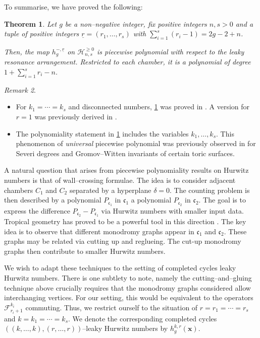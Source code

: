 \documentclass[10pt,a4paper,oneside,no-math,reqno]{amsart}%
\theoremstyle{plain}
\newtheorem{theorem}{Theorem}[section]
\theoremstyle{definition}
\theoremstyle{remark}
\newtheorem{remark}[theorem]{Remark}
\numberwithin{equation}{section}
\newcommand{\1}{\mathds{1}}
\newcommand{\<}{\langle}
\renewcommand{\>}{\rangle}
\begin{document}
To summarise, we have proved the following:

\begin{theorem}
\label{thm-piecepoly}
    Let $g$ be a non--negative integer, fix positive integers $n,s>0$ and a tuple of positive integers $\underline{r}=(r_1,\dots,r_s)$ with $\sum_{i=1}^s (r_i - 1) = 2g-2+n$.
    
    Then, the map $h_g^{-,\underline{r}}$ on $\mathcal{H}_{n,s}^{\ge0}$ is piecewise polynomial with respect to the leaky resonance arrangement. Restricted to each chamber, it is a polynomial of degree $1+\sum_{i=1}^s r_i -n$.
\end{theorem}

\begin{remark}
\begin{itemize}
    \item For $k_1=\cdots=k_s$ and disconnected numbers, \cref{thm-piecepoly} was proved in \cite{AKL25}. A version for $r=1$ was previously derived in \cite{CMR25}.
    \item The polynomiality statement in \cref{thm-piecepoly} includes the variables $k_1,\dots,k_s$. This phenomenon of \emph{universal} piecewise polynomial was previously observed in \cite{ardila2012universal,AB17} for Severi degrees and Gromov--Witten invariants of certain toric surfaces.
\end{itemize}

\end{remark}
 

A natural question that arises from piecewise polynomiality results on Hurwitz numbers is that of wall--crossing formulae. The idea is to consider adjacent chambers $C_1$ and $C_2$ separated by a hyperplane $\delta=0$. The counting problem is then described by a polynomial $P_{\mathfrak{c}_1}$ in $\mathfrak{c}_1$ a polynomial $P_{\mathfrak{c}_2}$ in $\mathfrak{c}_2$. The goal is to express the difference $P_{\mathfrak{c}_2}-P_{\mathfrak{c}_1}$ via Hurwitz numbers with smaller input data. Tropical geometry has proved to be a powerful tool in this direction \cite{CJM11,HL20}. The key idea is to observe that different monodromy graphs appear in $\mathfrak{c}_1$ and $\mathfrak{c}_2$. These graphs may be related via cutting up and reglueing. The cut-up monodromy graphs then contribute to smaller Hurwitz numbers.

We wish to adapt these techniques to the setting of completed cycles leaky Hurwitz numbers. There is one subtlety to note, namely the cutting--and--gluing technique above crucially requires that the monodromy graphs considered allow interchanging vertices. For our setting, this would be equivalent to the operators $\mathcal{F}_{r_i+1}^{k_i}$ commuting. Thus, we restrict ourself to the situation of $r=r_1=\cdots=r_s$ and $k=k_1=\cdots=k_s$. We denote the corresponding completed cycles $((k,\dots,k),(r,\dots,r))$--leaky Hurwitz numbers by $h_g^{k,r}(\mathbf{x})$.
\end{document}
